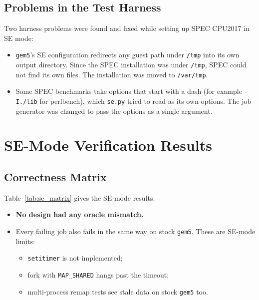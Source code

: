 \subsection{Problems in the Test Harness}
Two harness problems were found and fixed while setting up SPEC CPU2017 in SE mode:
\begin{itemize}
    \item \texttt{gem5}'s SE configuration redirects any guest path under \texttt{/tmp} into its own output directory. Since the SPEC installation was under \texttt{/tmp}, SPEC could not find its own files. The installation was moved to \texttt{/var/tmp}.
    \item Some SPEC benchmarks take options that start with a dash (for example \texttt{-I./lib} for perlbench), which \texttt{se.py} tried to read as its own options. The job generator was changed to pass the options as a single argument.
\end{itemize}

\section{SE-Mode Verification Results}
\label{sec:se_results}

\subsection{Correctness Matrix}
Table~\ref{tab:se_matrix} gives the SE-mode results.
\begin{itemize}
    \item \textbf{No design had any oracle mismatch.}
    \item Every failing job also fails in the same way on stock \texttt{gem5}. These are SE-mode limits:
    \begin{itemize}
        \item \texttt{setitimer} is not implemented;
        \item fork with \texttt{MAP\_SHARED} hangs past the timeout;
        \item multi-process remap tests see stale data on stock \texttt{gem5} too.
    \end{itemize}
\end{itemize}

